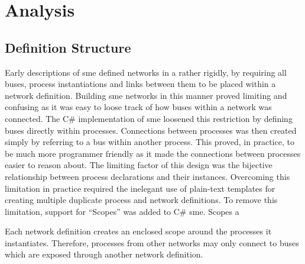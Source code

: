 \chapter{Analysis}

\section{Definition Structure}
Early descriptions of \gls{sme} defined networks in a rather rigidly, by
requiring all buses, process instantiations and links between them to be placed
within a network definition. Building \gls{sme} networks in this manner proved
limiting and confusing as it was easy to loose track of how buses within a
network was connected. The C\# implementation of \gls{sme} loosened this
restriction by defining buses directly within processes. Connections between
processes was then created simply by referring to a bus within another
process. This proved, in practice, to be much more programmer friendly as it
made the connections between processes easier to reason about. The limiting
factor of this design was the bijective relationship between process
declarations and their instances. Overcoming this limitation in practice
required the inelegant use of plain-text templates for creating multiple
duplicate process and network definitions. To remove this limitation, support
for ``Scopes'' was added to C\# \gls{sme}. Scopes a

Each network definition creates an enclosed scope around the processes it
instantiates. Therefore, processes from other networks may only connect to buses
which are exposed through another network definition. 

